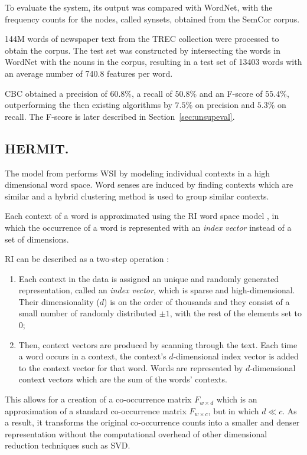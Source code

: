 To evaluate the system, its output was compared with WordNet, with the
frequency counts for the nodes, called synsets, obtained from the SemCor corpus.

144M words of newspaper text from the TREC collection were processed to obtain
the corpus. The test set was constructed by intersecting the words in
WordNet with the nouns in the corpus, resulting in a test set of 13403 words
with an average number of 740.8 features per word.

\ac{CBC} obtained a precision of $60.8\%$, a recall of $50.8\%$ and an
F-score of $55.4\%$, outperforming the then existing algorithms by $7.5\%$ on
precision and $5.3\%$ on recall. The F-score is later described in
Section~\ref{sec:unsupeval}.

\subsection{HERMIT.}

The model from \cite{jurgens2010hermit} performs \ac{WSI} by modeling individual
contexts in a high dimensional word space. Word senses are induced by finding
contexts which are similar and a hybrid clustering method is used to group
similar contexts.

Each context of a word is approximated using the \ac{RI} word space model
\cite{kanerva2000random}, in which the occurrence of a word is represented with
an \textit{index vector} instead of a set of dimensions.

\ac{RI} can be described as a two-step operation
\cite{sahlgren2005introduction}:

\begin{enumerate}
 \item Each context in the data is assigned an unique and randomly generated
 representation, called an \textit{index vector}, which is sparse and
 high-dimensional. Their dimensionality ($d$) is on the order of thousands and
 they consist of a small number of randomly distributed $\pm1$, with the rest
 of the elements set to $0$;
 \item Then, context vectors are produced by scanning through the text. Each
 time a word occurs in a context, the context's $d$-dimensional index vector is
 added to the context vector for that word. Words are represented by
 $d$-dimensional context vectors which are the sum of the words' contexts.
\end{enumerate}

This allows for a creation of a co-occurrence matrix $F_{w \times d}$ which is
an approximation of a standard co-occurrence matrix $F_{w \times c}$, but in
which $d \ll c$. As a result, it transforms the original co-occurrence counts
into a smaller and denser representation without the computational overhead of
other dimensional reduction techniques such as \ac{SVD}.

